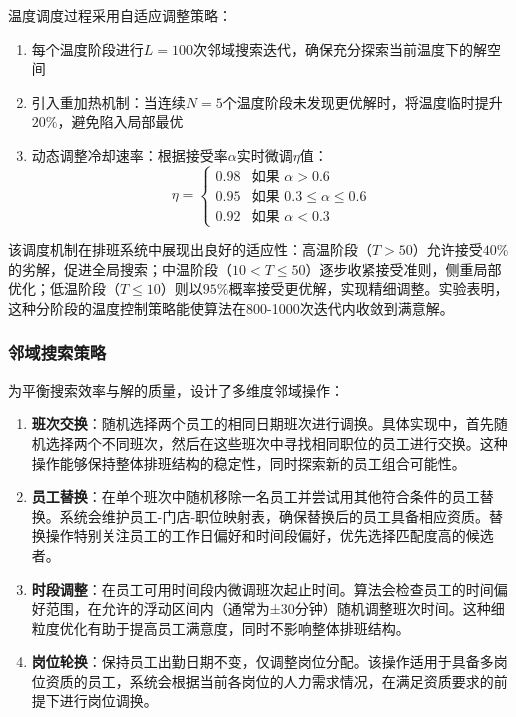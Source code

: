 \documentclass{ctexart}
\begin{document}
温度调度过程采用自适应调整策略：
\begin{enumerate}
    \item 每个温度阶段进行$L=100$次邻域搜索迭代，确保充分探索当前温度下的解空间
    \item 引入重加热机制：当连续$N=5$个温度阶段未发现更优解时，将温度临时提升$20\%$，避免陷入局部最优
    \item 动态调整冷却速率：根据接受率$\alpha$实时微调$\eta$值：
    \begin{equation}
    \eta = \begin{cases}
    0.98 & \text{如果 } \alpha > 0.6 \\
    0.95 & \text{如果 } 0.3 \leq \alpha \leq 0.6 \\
    0.92 & \text{如果 } \alpha < 0.3
    \end{cases}
    \end{equation}
\end{enumerate}

该调度机制在排班系统中展现出良好的适应性：高温阶段（$T>50$）允许接受$40\%$的劣解，促进全局搜索；中温阶段（$10<T\leq50$）逐步收紧接受准则，侧重局部优化；低温阶段（$T\leq10$）则以$95\%$概率接受更优解，实现精细调整。实验表明，这种分阶段的温度控制策略能使算法在800-1000次迭代内收敛到满意解。


\subsubsection{邻域搜索策略}
为平衡搜索效率与解的质量，设计了多维度邻域操作：
\begin{enumerate}
    \item \textbf{班次交换}：随机选择两个员工的相同日期班次进行调换。具体实现中，首先随机选择两个不同班次，然后在这些班次中寻找相同职位的员工进行交换。这种操作能够保持整体排班结构的稳定性，同时探索新的员工组合可能性。
    
    \item \textbf{员工替换}：在单个班次中随机移除一名员工并尝试用其他符合条件的员工替换。系统会维护员工-门店-职位映射表，确保替换后的员工具备相应资质。替换操作特别关注员工的工作日偏好和时间段偏好，优先选择匹配度高的候选者。
    
    \item \textbf{时段调整}：在员工可用时间段内微调班次起止时间。算法会检查员工的时间偏好范围，在允许的浮动区间内（通常为±30分钟）随机调整班次时间。这种细粒度优化有助于提高员工满意度，同时不影响整体排班结构。
    
    \item \textbf{岗位轮换}：保持员工出勤日期不变，仅调整岗位分配。该操作适用于具备多岗位资质的员工，系统会根据当前各岗位的人力需求情况，在满足资质要求的前提下进行岗位调换。
\end{enumerate}
\end{document}
